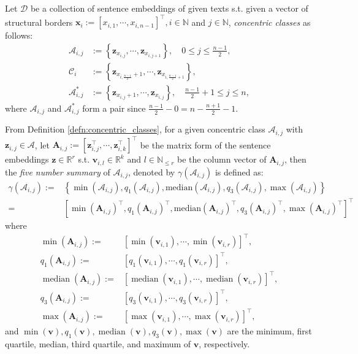 \begin{defn}\label{defn:concentric_classes}
    Let $\mathscr{D}$ be a collection of sentence embeddings of given texts s.t. given a vector of structural borders $\mathbf{x}_i:=[x_{i,1},\cdots,x_{i,n-1}]^{\top},i\in\mathbb{N}$ and $j\in\mathbb{N}$, \exists\; \textit{concentric classes} as follows:
    \begin{align}
        \mathscr{A}_{i,j}&:=\left\{\mathbf{z}_{x_{i,j}},\cdots,\mathbf{z}_{x_{i,j+1}}\right\},\quad 0\leq j\leq \frac{n-1}{2},\\
        \mathscr{C}_{i}&:=\left\{\mathbf{z}_{x_{i,\frac{n-1}{2}}+1},\cdots,\mathbf{z}_{x_{i,\frac{n-1}{2}+1}}\right\},\\
        \mathscr{A}_{i,j}^{*}&:=\left\{\mathbf{z}_{x_{i,j}+1},\cdots,\mathbf{z}_{x_{i,j}}\right\},\quad \frac{n-1}{2}+1\leq j\leq n,
    \end{align}
    where $\mathscr{A}_{i,j}$ and $\mathscr{A}_{i,j}^{*}$ form a pair since $\frac{n-1}{2}-0=n-\frac{n+1}{2}-1$.
\end{defn}
\begin{defn}\label{defn:five_number_summary}
    From Definition \ref{defn:concentric_classes}, for a given concentric class $\mathscr{A}_{i,j}$ with $\mathbf{z}_{i,j}\in\mathscr{A}$, let $\mathbf{A}_{i,j}:=[\mathbf{z}_{i,j}^{\top},\cdots,\mathbf{z}_{i,k}^{\top}]^{\top}$ be the matrix form of the sentence embeddings $\mathbf{z}\in\mathbb{R}^r$ s.t. $\mathbf{v}_{i,l}\in\mathbb{R}^k$ and $l\in\mathbb{N}_{\leq r}$ be the column vector of $\mathbf{A}_{i,j}$, then the \textit{five number summary} of $\mathscr{A}_{i,j}$, denoted by $\gamma(\mathscr{A}_{i,j})$ is defined as:
    \begin{align}
        \gamma(\mathscr{A}_{i,j}):=&\left\{\min(\mathscr{A}_{i,j}),q_1(\mathscr{A}_{i,j}),\text{median}(\mathscr{A}_{i,j}),q_3(\mathscr{A}_{i,j}),\max(\mathscr{A}_{i,j})\right\}\\
        =&\left[\min(\mathbf{A}_{i,j})^{\top},q_1(\mathbf{A}_{i,j})^{\top},\text{median}(\mathbf{A}_{i,j})^{\top},q_3(\mathbf{A}_{i,j})^{\top},\max(\mathbf{A}_{i,j})^{\top}\right]^{\top}
    \end{align}
    where 
    \begin{align}
        \min(\mathbf{A}_{i,j}):=&[\min(\mathbf{v}_{i,1}),\cdots,\min(\mathbf{v}_{i,r})]^{\top},\\
        q_1(\mathbf{A}_{i,j}):=&[q_1(\mathbf{v}_{i,1}),\cdots,q_1(\mathbf{v}_{i,r})]^{\top},\\
        \operatorname{median}(\mathbf{A}_{i,j}):=&[\operatorname{median}(\mathbf{v}_{i,1}),\cdots,\operatorname{median}(\mathbf{v}_{i,r})]^{\top},\\
        q_3(\mathbf{A}_{i,j}):=&[q_3(\mathbf{v}_{i,1}),\cdots,q_3(\mathbf{v}_{i,r})]^{\top},\\
        \max(\mathbf{A}_{i,j}):=&[\max(\mathbf{v}_{i,1}),\cdots,\max(\mathbf{v}_{i,r})]^{\top},
    \end{align}
    and $\min(\mathbf{v}),q_1(\mathbf{v}),\operatorname{median}(\mathbf{v}),q_3(\mathbf{v}),\max(\mathbf{v})$ are the minimum, first quartile, median, third quartile, and maximum of $\mathbf{v}$, respectively.
\end{defn}
